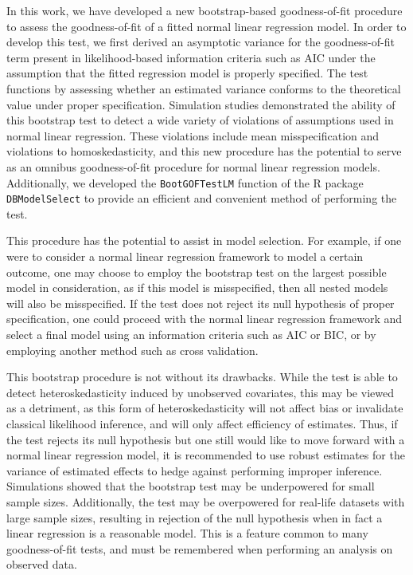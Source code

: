 \documentclass[12pt]{article} %
\theoremstyle{definition}
\begin{document}
In this work, we have developed a new bootstrap-based goodness-of-fit procedure to assess the goodness-of-fit of a fitted normal linear regression model. In order
to develop this test, we first derived an asymptotic variance for the goodness-of-fit term present in likelihood-based information criteria such as AIC under the assumption
that the fitted regression model is properly specified. The test functions by assessing whether an estimated variance conforms to the
theoretical value under proper specification. Simulation studies demonstrated the ability of this bootstrap test to detect a wide variety of violations of assumptions used in
normal linear regression. These violations include mean misspecification and violations to homoskedasticity, and this new procedure has the potential to serve as an omnibus
goodness-of-fit procedure for normal linear regression models. Additionally, we developed the \verb|BootGOFTestLM| function of the R package \verb|DBModelSelect| to provide
an efficient and convenient method of performing the test.

This procedure has the potential to assist in model selection. For example, if one were to consider a normal linear regression framework to model a certain outcome, one may
choose to employ the bootstrap test on the largest possible model in consideration, as if this model is misspecified, then all nested models will also be misspecified.
If the test does not reject its null hypothesis of proper specification, one could proceed with the normal linear regression framework and select a final model using
an information criteria such as AIC or BIC, or by employing another method such as cross validation.

This bootstrap procedure is not without its drawbacks. While the test is able to detect heteroskedasticity induced by unobserved covariates, this may be viewed as a detriment,
as this form of heteroskedasticity will not affect bias or invalidate classical likelihood inference, and will only affect efficiency of estimates. Thus, if the test rejects its
null hypothesis but one still would like  to move forward with a normal linear regression model, it is recommended to use robust estimates for the variance of estimated effects
to hedge against performing improper inference. Simulations showed that the bootstrap test may be underpowered for small sample sizes. Additionally, the test may be overpowered for real-life datasets with large sample sizes, resulting in rejection of the null hypothesis
when in fact a linear regression is a reasonable model. This is a feature common to many goodness-of-fit tests, and must be remembered when performing an analysis on observed data.
\end{document}
